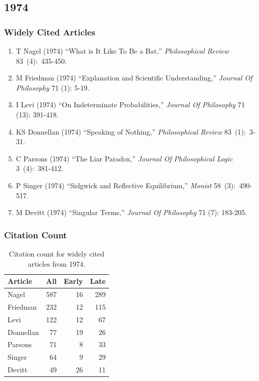 \documentclass[
  10pt,
  letterpaper,
  DIV=11,
  numbers=noendperiod,
  twoside]{scrartcl}
\providecommand{\tightlist}{%
  \setlength{\itemsep}{0pt}\setlength{\parskip}{0pt}}\usepackage{longtable,booktabs,array}
\begin{document}
\newpage

\subsection{1974}\label{sec-s1974}

\subsubsection*{Widely Cited Articles}\label{widely-cited-articles-18}

\begin{enumerate}
\def\labelenumi{\arabic{enumi}.}
\tightlist
\item
  T Nagel (1974) ``What is It Like To Be a Bat,'' \emph{Philosophical
  Review} 83~(4):~435-450.
\item
  M Friedman (1974) ``Explanation and Scientific Understanding,''
  \emph{Journal Of Philosophy} 71 (1): 5-19.
\item
  I Levi (1974) ``On Indeterminate Probabilities,'' \emph{Journal Of
  Philosophy} 71 (13): 391-418.
\item
  KS Donnellan (1974) ``Speaking of Nothing,'' \emph{Philosophical
  Review} 83~(1):~3-31.
\item
  C Parsons (1974) ``The Liar Paradox,'' \emph{Journal Of Philosophical
  Logic} 3~(4):~381-412.
\item
  P Singer (1974) ``Sidgwick and Reflective Equilibrium,'' \emph{Monist}
  58~(3):~490-517.
\item
  M Devitt (1974) ``Singular Terms,'' \emph{Journal Of Philosophy} 71
  (7): 183-205.
\end{enumerate}

\subsubsection*{Citation Count}\label{sec-count-1974}

\begin{longtable}[]{@{}lrrr@{}}

\caption{\label{tbl-citation-count-1974}Citation count for widely cited
articles from 1974.}

\tabularnewline

\toprule\noalign{}
Article & All & Early & Late \\
\midrule\noalign{}
\endhead
\bottomrule\noalign{}
\endlastfoot
Nagel & 587 & 16 & 289 \\
Friedman & 232 & 12 & 115 \\
Levi & 122 & 12 & 67 \\
Donnellan & 77 & 19 & 26 \\
Parsons & 71 & 8 & 33 \\
Singer & 64 & 9 & 29 \\
Devitt & 49 & 26 & 11 \\

\end{longtable}
\end{document}
